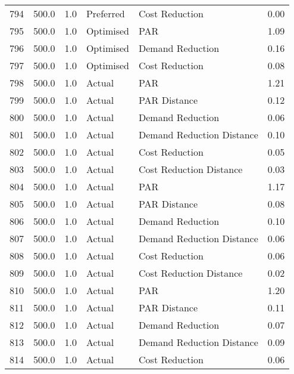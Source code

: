 \begin{longtable}{lrrllr}
794  &        500.0 &     1.0 &      Preferred &             Cost Reduction &   0.00 \\
795  &        500.0 &     1.0 &      Optimised &                        PAR &   1.09 \\
796  &        500.0 &     1.0 &      Optimised &           Demand Reduction &   0.16 \\
797  &        500.0 &     1.0 &      Optimised &             Cost Reduction &   0.08 \\
798  &        500.0 &     1.0 &         Actual &                        PAR &   1.21 \\
799  &        500.0 &     1.0 &         Actual &               PAR Distance &   0.12 \\
800  &        500.0 &     1.0 &         Actual &           Demand Reduction &   0.06 \\
801  &        500.0 &     1.0 &         Actual &  Demand Reduction Distance &   0.10 \\
802  &        500.0 &     1.0 &         Actual &             Cost Reduction &   0.05 \\
803  &        500.0 &     1.0 &         Actual &    Cost Reduction Distance &   0.03 \\
804  &        500.0 &     1.0 &         Actual &                        PAR &   1.17 \\
805  &        500.0 &     1.0 &         Actual &               PAR Distance &   0.08 \\
806  &        500.0 &     1.0 &         Actual &           Demand Reduction &   0.10 \\
807  &        500.0 &     1.0 &         Actual &  Demand Reduction Distance &   0.06 \\
808  &        500.0 &     1.0 &         Actual &             Cost Reduction &   0.06 \\
809  &        500.0 &     1.0 &         Actual &    Cost Reduction Distance &   0.02 \\
810  &        500.0 &     1.0 &         Actual &                        PAR &   1.20 \\
811  &        500.0 &     1.0 &         Actual &               PAR Distance &   0.11 \\
812  &        500.0 &     1.0 &         Actual &           Demand Reduction &   0.07 \\
813  &        500.0 &     1.0 &         Actual &  Demand Reduction Distance &   0.09 \\
814  &        500.0 &     1.0 &         Actual &             Cost Reduction &   0.06 \\

\end{longtable}

